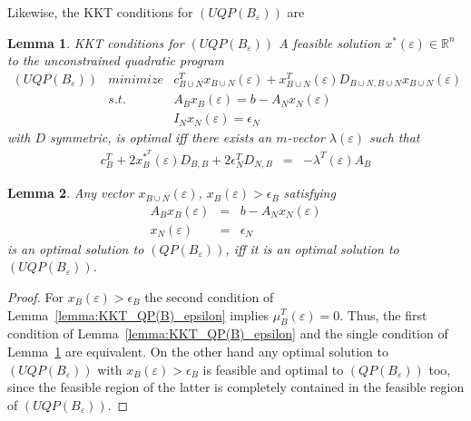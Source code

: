 \documentclass[a4paper]{article}
\newtheorem{lemma}{Lemma}
\begin{document}
Likewise, the KKT conditions for $(UQP(B_{\varepsilon}))$ are
\begin{lemma}{KKT conditions for $(UQP(B_{\varepsilon}))$}
\label{lemma:KKT_UQP(B)_epsilon}
A feasible solution $x^{*}(\varepsilon) \in \mathbb{R}^{n}$ to the
unconstrained quadratic program
\begin{eqnarray*}
  \mbox{$(UQP(B_{\varepsilon}))$} & minimize & c_{B \cup N}^{T}
    x_{B \cup N}(\varepsilon)
    + x_{B \cup N}^{T}(\varepsilon) D_{B \cup N, B \cup N}
    x_{B \cup N}(\varepsilon) \\
    & s.t. & A_{B}x_{B}(\varepsilon) = b - A_{N}x_{N}(\varepsilon)  \\
    & & I_{N}x_{N}(\varepsilon) = \epsilon_{N}  
\end{eqnarray*}
with $D$ symmetric, is optimal iff there exists an $m$-vector
$\lambda(\varepsilon)$ such that
\begin{eqnarray}
  c_{B}^{T} + 2x_{B}^{*^{\scriptstyle{T}}}(\varepsilon)D_{B,B} +
  2\epsilon_{N}^{T}D_{N,B} & = &
    -\lambda^{T}(\varepsilon)A_{B}
\end{eqnarray}
\end{lemma}

\begin{lemma}
\label{lemma:strict}
Any vector $x_{B \cup N}(\varepsilon)$, $x_{B}(\varepsilon) > \epsilon_{B}$
satisfying
\begin{eqnarray}
A_{B}x_{B}(\varepsilon) & = & b - A_{N}x_{N}(\varepsilon) \\
x_{N}(\varepsilon) &  = & \epsilon_{N}
\end{eqnarray}
is an optimal solution to $(QP(B_{\varepsilon}))$, iff it is an optimal
solution to $(UQP(B_{\varepsilon}))$.
\end{lemma}

\begin{proof}
For $x_{B}(\varepsilon) > \epsilon_{B}$ the second condition of
Lemma~\ref{lemma:KKT_QP(B)_epsilon} implies $\mu_{B}^{T}(\varepsilon)=0$.
Thus, the first condition of Lemma~\ref{lemma:KKT_QP(B)_epsilon} and the
single condition of Lemma~\ref{lemma:KKT_UQP(B)_epsilon} are equivalent.
On the other hand any optimal solution to $(UQP(B_{\varepsilon}))$ with
$x_{B}(\varepsilon) > \epsilon_{B}$ is feasible and optimal to
$(QP(B_{\varepsilon}))$ too, since the feasible region of the latter is
completely contained in the feasible region of $(UQP(B_{\varepsilon}))$.
\end{proof}
\end{document}
